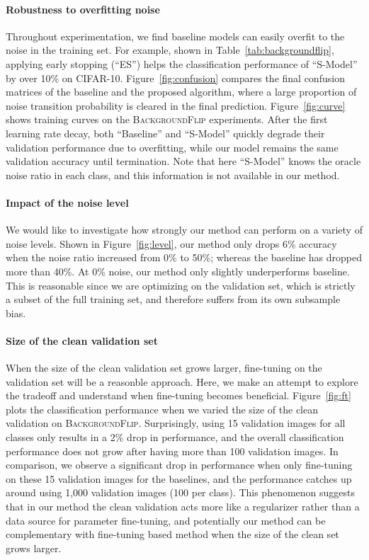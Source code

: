 \paragraph{Robustness to overfitting noise} Throughout experimentation, we find baseline
models can easily overfit to the noise in the training set. For example, shown in
Table~\ref{tab:backgroundflip}, applying early stopping (``ES'') helps the classification
performance of ``S-Model'' by over 10\% on CIFAR-10. Figure~\ref{fig:confusion} compares the final
confusion matrices of the baseline and the proposed algorithm, where a large proportion of noise
transition probability is cleared in the final prediction. Figure~\ref{fig:curve} shows training
curves on the \textsc{BackgroundFlip} experiments. After the first learning rate decay, both
``Baseline'' and ``S-Model'' quickly degrade their validation performance due to overfitting, while
our model remains the same validation accuracy until termination. Note that here ``S-Model'' knows
the oracle noise ratio in each class, and this information is not available in our method.
\vspace{-0.05in}
\paragraph{Impact of the noise level} We would like to investigate how strongly our method can
perform on a variety of noise levels. Shown in Figure~\ref{fig:level}, our method only drops 6\%
accuracy when the noise ratio increased from 0\% to 50\%; whereas the baseline has dropped more than
40\%. At 0\% noise, our method only slightly underperforms baseline. This is reasonable since we are
optimizing on the validation set, which is strictly a subset of the full training set, and therefore
suffers from its own subsample bias.
\vspace{-0.05in}
\paragraph{Size of the clean validation set} When the size of the clean validation set grows larger,
fine-tuning on the validation set will be a reasonble approach. Here, we make an attempt to explore
the tradeoff and understand when fine-tuning becomes beneficial. Figure~\ref{fig:ft} plots the
classification performance when we varied the size of the clean validation on
\textsc{BackgroundFlip}. Surprisingly, using 15 validation images for all classes only results in a
2\% drop in performance, and the overall classification performance does not grow after having more
than 100 validation images. In comparison, we observe a significant drop in performance when only
fine-tuning on these 15 validation images for the baselines, and the performance catches up around
using 1,000 validation images (100 per class). This phenomenon suggests that in our method the clean
validation acts more like a regularizer rather than a data source for parameter fine-tuning, and
potentially our method can be complementary with fine-tuning based method when the size of the clean
set grows larger.
